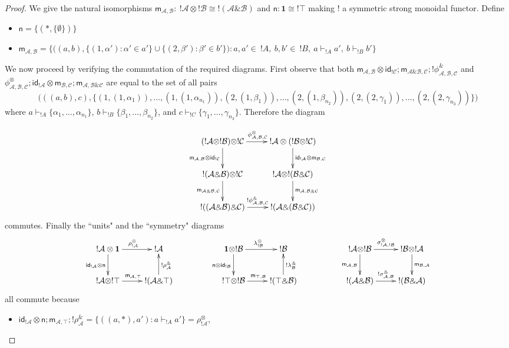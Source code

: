 \documentclass[copyright,creativecommons]{eptcs}
\newcommand{\cA}{\mathcal{A}}
\newcommand{\cB}{\mathcal{B}}
\newcommand{\cC}{\mathcal{C}}
\newcommand{\ga}{\alpha}
\newcommand{\gb}{\beta}
\newcommand{\id}{\textsf{id}} \newcommand{\ide}{\mathrm{id}} \newcommand{\fst}{\mathrm{fst}}
\begin{document}
\begin{proof}
We give the natural isomorphisms $\textsf{m}_{\cA,\cB}:\ ! \cA  \otimes ! \cB \cong !(\cA \binampersand \cB)$ and $\textsf{n}: \mathbf{1} \cong ! \top$ making $!$ a symmetric strong monoidal functor. Define 
\begin{itemize}
\item $\textsf{n} = \{(\ast, \{\emptyset\})\}$
\item $\textsf{m}_{\cA,\cB} = \big\{\big( (a,b), \{(1,\ga') : \ga' \in a' \} \cup \{(2,\gb') : \gb' \in b' \} \big) : a,a' \in \ ! A,\ b,b' \in \ ! B,\ a \vdash_{! A} a',\ b \vdash_{! B} b' \big\}$
\end{itemize}


We now proceed by verifying the commutation of the required diagrams. First observe that both $\textsf{m}_{\cA,\cB} \otimes \id_{! \cC} ; \textsf{m}_{\cA \binampersand \cB, \cC} ; ! \phi_{\cA,\cB,\cC}^\binampersand$ and $\phi_{\cA,\cB,\cC}^\otimes ; \textsf{id}_{! \cA} \otimes \textsf{m}_{\cB,\cC}  ; \textsf{m}_{\cA ,\cB \binampersand \cC}$ are equal to the set of all pairs 
$$\Big( ((a,b),c), \{(1,(1, \alpha_1)), \ldots, (1,(1, \alpha_{n_1})), (2,(1, \beta_1)), \ldots, (2, (1,\beta_{n_2})), (2,(2, \gamma_1)), \ldots, (2,(2, \gamma_{n_3}))\} \Big) $$
where $a \vdash_{!A} \{\alpha_1, \ldots, \alpha_{n_1}\}$, $b \vdash_{!B} \{\beta_1, \ldots, \beta_{n_2}\}$, and $c \vdash_{!C} \{\gamma_1, \ldots, \gamma_{n_3}\}$. Therefore the diagram

$$
\xymatrix{
(! \cA \otimes ! \cB) \otimes ! \cC \ar[r]^{\phi_{\cA, \cB, \cC}^\otimes} \ar[d]_{\textsf{m}_{\cA,\cB} \otimes \textsf{id}_{! \cC}} & ! \cA \otimes (! \cB \otimes ! \cC) \ar[d]^{\textsf{id}_{! \cA} \otimes \textsf{m}_{\cB,\cC}} \\
! (\cA \binampersand \cB) \otimes ! \cC \ar[d]_{\textsf{m}_{\cA \binampersand \cB,\cC}} & ! \cA \otimes ! (\cB \binampersand \cC) \ar[d]^{\textsf{m}_{\cA, \cB \binampersand \cC}} \\
! ((\cA \binampersand \cB) \binampersand \cC) \ar[r]^{! \phi_{\cA, \cB, \cC}^\binampersand} & ! (\cA \binampersand (\cB \binampersand \cC)) \\
}
$$
commutes. Finally the ``units" and the ``symmetry" diagrams
$$
\xymatrix{
! \cA \otimes \mathbf{1} \ar[r]^{\rho_{!\cA}^\otimes} \ar[d]_{\textsf{id}_{! \cA}  \otimes \textsf{n}} & ! \cA & & \mathbf{1} \otimes ! \cB \ar[r]^{\lambda_{!\cB}^\otimes} \ar[d]_{\textsf{n} \otimes \textsf{id}_{! \cB}} & ! \cB & & !\cA \otimes !\cB \ar[r]^{\sigma_{!\cA,!\cB}^\otimes} \ar[d]_{\textsf{m}_{\cA,\cB}} & !\cB \otimes !\cA \ar[d]^{\textsf{m}_{\cB,\cA}} \\
! \cA \otimes ! \top \ar[r]^{\textsf{m}_{\cA, \top}} & ! (\cA \binampersand \top) \ar[u]_{! \rho_\cA^\binampersand} & & ! \top \otimes ! \cB \ar[r]^{\textsf{m}_{\top, \cB}} & ! (\top \binampersand \cB) \ar[u]_{! \lambda_\cB^\binampersand} & & !(\cA \binampersand \cB) \ar[r]^{!\sigma_{\cA,\cB}^\binampersand} & ! (\cB \binampersand \cA)
}
$$
all commute because 
\begin{itemize}
\item $\id_{! \cA}  \otimes \textsf{n} ; \textsf{m}_{\cA, \top} ; !\rho_\cA^\binampersand = \{((a, \ast),a') : a \vdash_{! A} a'\} = \rho_{!\cA}^\otimes$,


\end{itemize}
\end{proof}
\end{document}
